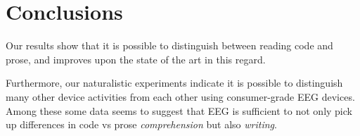 \section{Conclusions}

Our results show that it is possible to distinguish between reading code and prose, and improves upon the state of the art in this regard.

Furthermore, our naturalistic experiments indicate it is possible to distinguish many other device activities from each other using consumer-grade EEG devices. Among these some data seems to suggest that EEG is sufficient to not only pick up differences in code vs prose \emph{comprehension} but also \emph{writing}.
